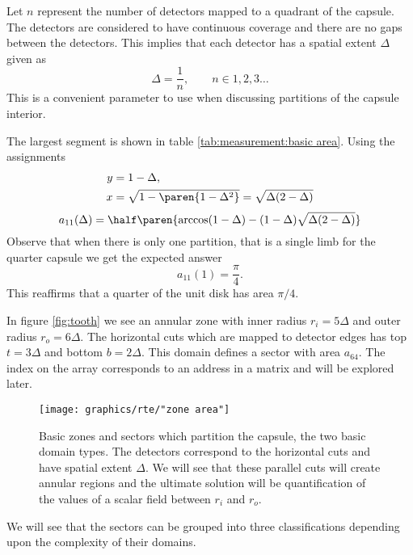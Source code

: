 Let $n$ represent the number of detectors mapped to a quadrant of the capsule. The detectors are considered to have continuous coverage and there are no gaps between the detectors. This implies that each detector has a spatial extent $\Delta$ given as
\begin{equation}
  \Delta = \frac{1}{n}, \qquad n \in 1,2,3\dots
  \label{eq:defn:delta}
\end{equation}
This is a convenient parameter to use when discussing partitions of the capsule interior.

The largest segment is shown in table \eqref{tab:measurement:basic area}. Using the assignments
\begin{equation}
  \begin{split}
    y &= 1 - \Delta, \\
    x &= \sqrt{1 - \paren{1-\Delta^{2}}} = \sqrt{\Delta (2-\Delta)}
  \end{split}
\end{equation}
\begin{equation}
  a_{11}(\Delta) = \half \paren{ \arccos (1-\Delta) - (1-\Delta) \sqrt{\Delta (2-\Delta)} }
\end{equation}
%
Observe that when there is only one partition, that is a single limb for the quarter capsule we get the expected answer
%
\begin{equation}
  a_{11}(1) = \frac{\pi}{4}.
\end{equation}
%
This reaffirms that a quarter of the unit disk has area $\pi/4$.

In figure \eqref{fig:tooth} we see an annular zone with inner radius $r_{i} = 5\Delta$ and outer radius $r_{o} = 6\Delta$. The horizontal cuts which are mapped to detector edges has top $t=3\Delta$ and bottom $b=2\Delta$. This domain defines a sector with area $a_{64}$. The index on the array corresponds to an address in a matrix and will be explored later.
\begin{figure}[htbp] 
   \centering
   \texttt{[image: graphics/rte/"zone area"]} 
   \caption[Zones and sectors]{Basic zones and sectors which partition the capsule, the two basic domain types. The detectors correspond to the horizontal cuts and have spatial extent $\Delta$. We will see that these parallel cuts will create annular regions and the ultimate solution will be quantification of the values of a scalar field between $r_{i}$ and $r_{o}$. }
   \label{fig:tooth}
\end{figure}

We will see that the sectors can be grouped into three classifications depending upon the complexity of their domains.

\endinput %